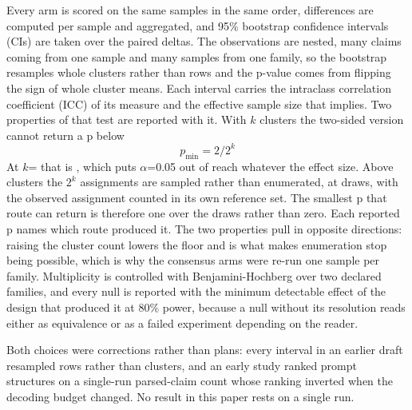 Every arm is scored on the same samples in the same order, differences are computed per sample and
aggregated, and 95\% bootstrap confidence intervals (CIs) are taken over the paired deltas. The
observations are nested, many claims coming from one sample and many samples from one family, so the
bootstrap resamples whole clusters rather than rows and the p-value comes from flipping the sign of
whole cluster means. Each interval carries the intraclass correlation coefficient (ICC) of its
measure and the effective sample size that implies. Two properties of that test are reported with it. With $k$ clusters the
two-sided version cannot return a p below
\begin{equation}\label{eq:floor}
p_{\min} = 2 \big/ 2^{k}
\end{equation}
At $k$= that is , which puts $\alpha$=0.05 out of reach
whatever the effect size. Above  clusters the $2^k$ assignments are sampled rather than
enumerated, at  draws, with the observed assignment counted in its own reference
set. The smallest p that route can return is therefore one over the draws rather than zero. Each reported p names which
route produced it. The two properties pull in opposite directions: raising the cluster count lowers the floor and is
what makes enumeration stop being possible, which is why the consensus arms were
re-run one sample per family. Multiplicity is controlled with Benjamini-Hochberg over two
declared families, and every null is reported with the minimum detectable effect of the design that
produced it at 80\% power, because a null without its resolution reads either as equivalence or as a
failed experiment depending on the reader.

Both choices were corrections rather than plans: every interval in an earlier draft resampled rows
rather than clusters, and an early study ranked prompt structures on a single-run parsed-claim count
whose ranking inverted when the decoding budget changed. No result in this paper rests on a single
run.
